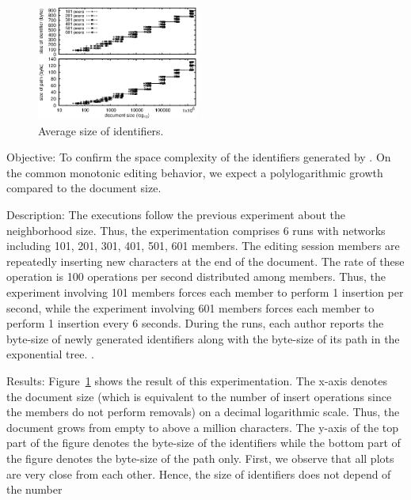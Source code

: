 \ \\

\begin{figure}
  \centering
  \includegraphics[width=0.475\textwidth]{./img/identifiers.eps}
  \caption{\label{fig:identifiers} Average size of identifiers.}
\end{figure}

\begin{asparadesc}
\item [Objective:] To confirm the space complexity of the identifiers generated
  by \LSEQ. On the common monotonic editing behavior, we expect a
  polylogarithmic growth compared to the document size.
\item [Description:] The executions follow the previous experiment about the
  neighborhood size. Thus, the experimentation comprises 6 runs with networks
  including 101, 201, 301, 401, 501, 601 members. The editing session members
  are repeatedly inserting new characters at the end of the document. The rate
  of these operation is 100 operations per second distributed among
  members. Thus, the experiment involving 101 members forces each member to
  perform 1 insertion per second, while the experiment involving 601 members
  forces each member to perform 1 insertion every 6 seconds. During the runs,
  each author reports the byte-size of newly generated identifiers along with
  the byte-size of its path in the exponential tree. .
\item [Results:] Figure~\ref{fig:identifiers} shows the result of this
  experimentation. The x-axis denotes the document size (which is equivalent to
  the number of insert operations since the members do not perform removals) on
  a decimal logarithmic scale. Thus, the document grows from empty to above a
  million characters. The y-axis of the top part of the figure denotes the
  byte-size of the identifiers while the bottom part of the figure denotes the
  byte-size of the path only. First, we observe that all plots are very close
  from each other. Hence, the size of identifiers does not depend of the number

\end{asparadesc}
